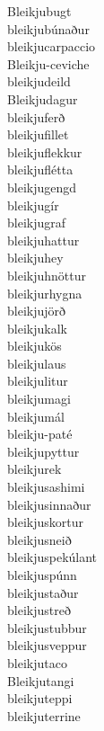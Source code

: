 \documentclass[../samsetningasafn.tex]{subfiles}
\begin{document}
\begin{bigwordlist}
\begin{center}
\begin{footnotesize}
\begin{multicols}{4}
\begin{description}
		\item [Bleikjubugt]
		\item [bleikjubúnaður]
		\item [bleikjucarpaccio]
		\item [Bleikju-ceviche]
		\item [bleikjudeild]
		\item [Bleikjudagur]
		\item [bleikjuferð]
		\item [bleikjufillet]
		\item [bleikjuflekkur]
		\item [bleikjuflétta]
		\item [bleikjugengd]
		\item [bleikjugír]
		\item [bleikjugraf]
		\item [bleikjuhattur]
		\item [bleikjuhey]
		\item [bleikjuhnöttur]
		\item [bleikjurhygna]
		\item [bleikjujörð]
		\item [bleikjukalk]
		\item [bleikjukös]
		\item [bleikjulaus]
		\item [bleikjulitur]
		\item [bleikjumagi]
		\item [bleikjumál]
		\item [bleikju-paté]
		\item [bleikjupyttur]
		\item [bleikjurek]
		\item [bleikjusashimi]
		\item [bleikjusinnaður]
		\item [bleikjuskortur]
		\item [bleikjusneið]
		\item [bleikjuspekúlant]
		\item [bleikjuspúnn]
		\item [bleikjustaður]
		\item [bleikjustreð]
		\item [bleikjustubbur]
		\item [bleikjusveppur]
		\item [bleikjutaco]
		\item [Bleikjutangi]
		\item [bleikjuteppi]
		\item [bleikjuterrine]

\end{description}
\end{multicols}
\end{footnotesize}
\end{center}
\end{bigwordlist}
\end{document}
